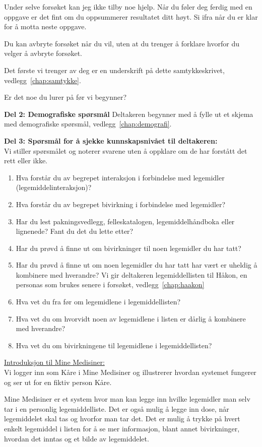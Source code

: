 Under selve forsøket kan jeg ikke tilby noe hjelp. Når du føler deg ferdig med en oppgave er det fint om du oppsummerer resultatet ditt høyt. Si ifra når du er klar for å motta neste oppgave. 

Du kan avbryte forsøket når du vil, uten at du trenger å forklare hvorfor du velger å avbryte forsøket.

Det første vi trenger av deg er en underskrift på dette samtykkeskrivet, vedlegg~\ref{chap:samtykke}.

Er det noe du lurer på før vi begynner? 

\textbf{Del 2: Demografiske spørsmål}
Deltakeren begynner med å fylle ut et skjema med demografiske spørsmål, vedlegg~\ref{chap:demografi}.

\textbf{Del 3: Spørsmål for å sjekke kunnskapsnivået til deltakeren:} \\
Vi stiller spørsmålet og noterer svarene uten å oppklare om de har forstått det rett eller ikke. 
\begin{enumerate}
\item Hva forstår du av begrepet interaksjon i forbindelse med legemidler (legemiddelinteraksjon)?
\item Hva forstår du av begrepet bivirkning i forbindelse med legemidler?
\item Har du lest pakningsvedlegg, felleskatalogen, legemiddelhåndboka eller lignenede? Fant du det du lette etter?
\item Har du prøvd å finne ut om bivirkninger til noen legemidler du har tatt?
\item Har du prøvd å finne ut om noen legemidler du har tatt har vært er uheldig å kombinere med hverandre?
Vi gir deltakeren legemiddellisten til Håkon, en personas som brukes senere i forsøket, vedlegg~\ref{chap:haakon}
\item Hva vet du fra før om legemidlene i legemiddellisten?
\item Hva vet du om hvorvidt noen av legemidlene i listen er dårlig å kombinere med hverandre?
\item Hva vet du om bivirkningene til legemidlene i legemiddellisten?
\end{enumerate}

\underline{Introduksjon til Mine Medisiner:}\\
Vi logger inn som Kåre i Mine Medisiner og illustrerer hvordan systemet fungerer og ser ut for en fiktiv person Kåre.

Mine Medisiner er et system hvor man kan legge inn hvilke legemidler man selv tar i en personlig legemiddelliste. Det er også mulig å legge inn dose, når legemiddelet skal tas og hvorfor man tar det. Det er mulig å trykke på hvert enkelt legemiddel i listen for å se mer informasjon, blant annet bivirkninger, hvordan det inntas og et bilde av legemiddelet. 

